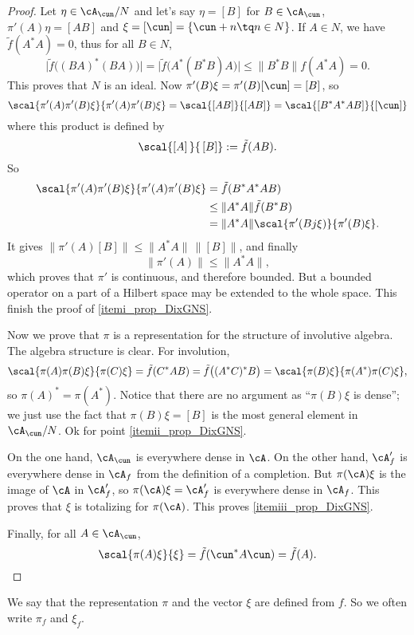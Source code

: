 \begin{proof}

	Let $\eta\in\cA_{\cun}/N$ and let's say $\eta=[B]$ for $B\in\cA_{\cun}$, $\pi'(A)\eta=[AB]$ and $\xi=[\cun]=\{ \cun+n\tq n\in N \}$. If $A\in N$, we have $\tilde f(A^*A)=0$, thus for all $B\in N$,
	\[ 
	  \big|  \tilde f\big( (BA)^*(BA) \big)   \big|=\big| \tilde f\big( A^*(B^*B)A \big) \big| \leq \| B^*B \|f(A^*A)=0.
	\]
	This proves that $N$ is an ideal. Now $\pi'(B)\xi=\pi'(B)[\cun]=[B]$, so
	\[ 
	\scal{ \pi'(A)\pi'(B)\xi }{ \pi'(A)\pi'(B)\xi }=\scal{ [AB] }{ [AB] }
			=\scal{ [B^*A^*AB] }{ [\cun] }
	\]
	where this product is defined by
	\begin{equation}
	  \scal{ [A]\, }{\, [B] }:=\tilde f(AB).
	\end{equation}
	So
	\[ 
	 \begin{split}
	 \scal{ \pi'(A)\pi'(B)\xi }{ \pi'(A)\pi'(B)\xi }&=\tilde f(B^*A^*AB)\\
			&\leq \| A^*A \|\tilde f(B^*B) \\
			&=\| A^*A \|\scal{ \pi'(Bj\xi) }{ \pi'(B)\xi }.
	\end{split} 
	\]
	It gives $\| \pi'(A)[B] \|\leq\| A^*A \|\,\| [B] \|$, and finally
	\begin{equation}
	  \| \pi'(A) \|\leq\| A^*A \|,
	\end{equation}
	which proves that $\pi'$ is continuous, and therefore bounded. But a bounded operator on a part of a Hilbert space may be extended to the whole space. This finish the proof of \ref{itemi_prop_DixGNS}.

	Now we prove that $\pi$ is a representation for the structure of involutive algebra. The algebra structure is clear. For involution,
	\[ 
	\scal{ \pi(A)\pi(B)\xi }{ \pi(C)\xi }	=\tilde f(C^*AB)
						=\tilde f\big( (A^*C)^*B \big)
						=\scal{ \pi(B)\xi }{ \pi(A^*)\pi(C)\xi },
	\]
	so $\pi(A)^*=\pi(A^*)$. Notice that there are no argument as ``$\pi(B)\xi$ is dense''; we just use the fact that $\pi(B)\xi=[B]$ is the most general element in $\cA_{\cun}/N$. Ok for point \ref{itemii_prop_DixGNS}.

	On the one hand, $\cA_{\cun}$ is everywhere dense in $\cA$. On the other hand, $\cA'_f$ is everywhere dense in $\cA_f$ from the definition of a completion. But $\pi(\cA)\xi$ is the image of $\cA$ in $\cA'_f$, so $\pi(\cA)\xi=\cA'_f$ is everywhere dense in $\cA_f$. This proves that $\xi$ is totalizing for $\pi(\cA)$.  This proves \ref{itemiii_prop_DixGNS}.

	Finally, for all $A\in\cA_{\cun}$, 
	\[ 
	  \scal{ \pi(A)\xi }{ \xi }=\tilde f(\cun^*A\cun)=\tilde f(A).
	\]
	  
\end{proof}
We say that the representation $\pi$ and the vector $\xi$ are defined from $f$. So we often write $\pi_f$ and $\xi_f$.

